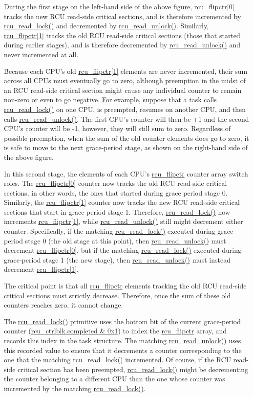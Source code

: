 During the first stage on the left-hand side of the above figure,
\url{rcu_flipctr[0]} tracks the new
RCU read-side critical sections, and is therefore incremented by
\url{rcu_read_lock()} and decremented by \url{rcu_read_unlock()}.
Similarly, \url{rcu_flipctr[1]} tracks the old RCU read-side
critical sections (those that started during earlier stages), and
is therefore decremented by \url{rcu_read_unlock()} and never
incremented at all.

Because each CPU's old \url{rcu_flipctr[1]} elements are never
incremented, their sum across all CPUs must eventually go to zero,
although preemption in the midst of an RCU read-side critical section might
cause any individual counter to remain non-zero or even to go negative.
For example, suppose that a task calls \url{rcu_read_lock()} on
one CPU, is preempted, resumes on another CPU, and then calls
\url{rcu_read_unlock()}.
The first CPU's counter will then be +1 and the second CPU's counter
will be -1, however, they will still sum to zero.
Regardless of possible preemption, when the sum of the old counter
elements does go to zero, it is safe to move to the next grace-period
stage, as shown on the right-hand side of the above figure.

In this second stage, the elements of each CPU's \url{rcu_flipctr}
counter array switch roles.
The \url{rcu_flipctr[0]} counter now tracks the old RCU read-side
critical sections, in other words, the ones that started during
grace period stage 0.
Similarly, the \url{rcu_flipctr[1]} counter now tracks the new
RCU read-side critical sections that start in grace period stage 1.
Therefore, \url{rcu_read_lock()} now increments
\url{rcu_flipctr[1]}, while \url{rcu_read_unlock()} still
might decrement either counter.
Specifically, if the matching \url{rcu_read_lock()} executed
during grace-period stage 0 (the old stage at this point), then
\url{rcu_read_unlock()} must decrement \url{rcu_flipctr[0]},
but if the matching \url{rcu_read_lock()} executed during
grace-period stage 1 (the new stage), then \url{rcu_read_unlock()}
must instead decrement \url{rcu_flipctr[1]}.

The critical point is that all \url{rcu_flipctr} elements
tracking the old RCU read-side critical sections must strictly decrease.
Therefore, once the sum of these old counters reaches zero,
it cannot change.

The \url{rcu_read_lock()} primitive uses the bottom
bit of the current grace-period counter
(\url{rcu_ctrlblk.completed & 0x1}) to index the
\url{rcu_flipctr} array,
and records this index in the task structure.
The matching \url{rcu_read_unlock()} uses this recorded
value to ensure that it decrements a counter corresponding to
the one that the matching \url{rcu_read_lock()} incremented.
Of course, if the RCU read-side critical section has been preempted,
\url{rcu_read_lock()} might be decrementing the counter
belonging to a different CPU than the one whose counter was incremented
by the matching \url{rcu_read_lock()}.

